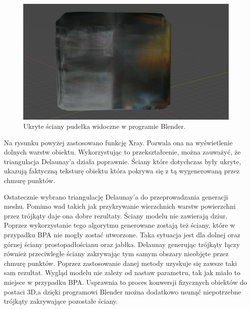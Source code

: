 \begin{figure}[H]
  \centering
  \includegraphics[scale=0.2]{delaBlendBoxXray.png}
  \caption{Ukryte ściany pudełka widoczne w programie Blender.}   
  \label{fig:pytcytpic}
\end{figure}
Na rysunku powyżej zastosowano funkcję Xray. Pozwala ona na wyświetlenie dolnych warstw obiektu. Wykorzystując to przekształcenie, można zauważyć, że triangulacja Delaunay'a działa poprawnie. Ściany które dotychczas były ukryte, ukazują faktyczną teksturę obiektu która pokrywa się z tą wygenerowaną przez chmurę punktów.

Ostatecznie wybrano triangulację Delaunay'a do przeprowadzania generacji meshu. Pomimo wad takich jak przykrywanie wierzchnich warstw powierzchni przez trójkąty daje ona dobre rezultaty. Ściany modelu nie zawierają dziur. Poprzez wykorzystanie tego algorytmu generowane zostają też ściany, które w przypadku BPA nie mogły zostać utworzone. Taka sytuacja jest dla dolnej oraz górnej ściany prostopadłościanu oraz jabłka. Delaunay generując trójkąty łączy również przeciwległe ściany zakrywając tym samym obszary nieobjęte przez chmurę punktów. Poprzez zastosowanie danej metody uzyskuje się zawsze taki sam rezultat. Wygląd modelu nie zależy od nastaw parametru, tak jak miało to miejsce w przypadku BPA. Usprawnia to proces konwersji fizycznych obiektów do postaci 3D,a dzięki programowi Blender można dodatkowo usunąć niepotrzebne trójkąty zakrywające pozostałe ściany.




